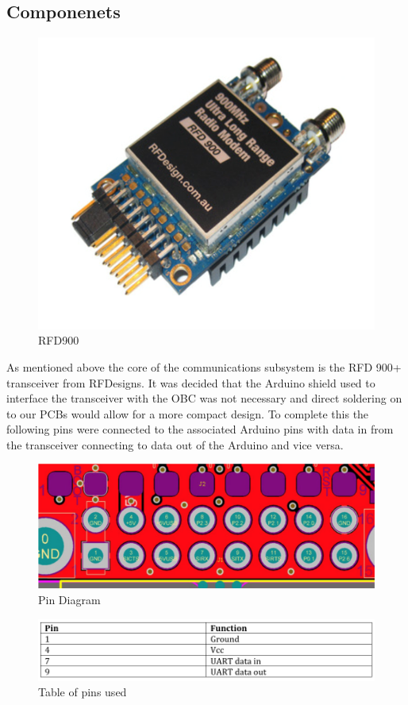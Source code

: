 \subsection{Componenets}
\begin{figure}[H]
    \centering
    \includegraphics[width=0.6\linewidth]{./figures/rfd}
    \caption{RFD900}
\end{figure}
\noindent
As mentioned above the core of the communications subsystem is the RFD 900+ transceiver from RFDesigns. It was decided that the Arduino shield used to interface the transceiver with the OBC was not necessary and direct soldering on to our PCBs would allow for a more compact design. To complete this the following pins were connected to the associated Arduino pins with data in from the transceiver connecting to data out of the Arduino and vice versa. 
\begin{figure}[H]
\centering
\includegraphics[width=\linewidth]{./figures/pins}
\caption{Pin Diagram}
\end{figure}
\begin{figure}[H]
    \centering
    \includegraphics[width=0.75\linewidth]{./figures/tablepins}
    \caption{Table of pins used}
\end{figure}
